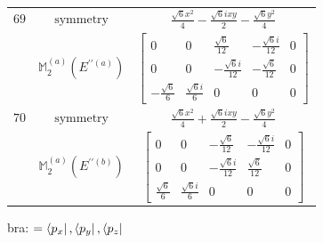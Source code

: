 \documentclass[fleqn,8pt,landscape]{jsarticle}
\begin{document}
\begin{longtable}{ccc}
$ 69 $ & $ \text{symmetry} $ & $ \frac{\sqrt{6} x^{2}}{4} - \frac{\sqrt{6} i x y}{2} - \frac{\sqrt{6} y^{2}}{4} $ \\
$  $ & $ \mathbb{M}_{2}^{(a)}(E^{\prime\prime(a)}) $ & $ \begin{bmatrix} 0 & 0 & \frac{\sqrt{6}}{12} & - \frac{\sqrt{6} i}{12} & 0 \\ 0 & 0 & - \frac{\sqrt{6} i}{12} & - \frac{\sqrt{6}}{12} & 0 \\ - \frac{\sqrt{6}}{6} & \frac{\sqrt{6} i}{6} & 0 & 0 & 0 \end{bmatrix} $ \\ \hline
$ 70 $ & $ \text{symmetry} $ & $ \frac{\sqrt{6} x^{2}}{4} + \frac{\sqrt{6} i x y}{2} - \frac{\sqrt{6} y^{2}}{4} $ \\
$  $ & $ \mathbb{M}_{2}^{(a)}(E^{\prime\prime(b)}) $ & $ \begin{bmatrix} 0 & 0 & - \frac{\sqrt{6}}{12} & - \frac{\sqrt{6} i}{12} & 0 \\ 0 & 0 & - \frac{\sqrt{6} i}{12} & \frac{\sqrt{6}}{12} & 0 \\ \frac{\sqrt{6}}{6} & \frac{\sqrt{6} i}{6} & 0 & 0 & 0 \end{bmatrix} $ \\ \hline
\end{longtable}
bra: $=\bra{p_{x}}, \bra{p_{y}}, \bra{p_{z}}$
\end{document}
